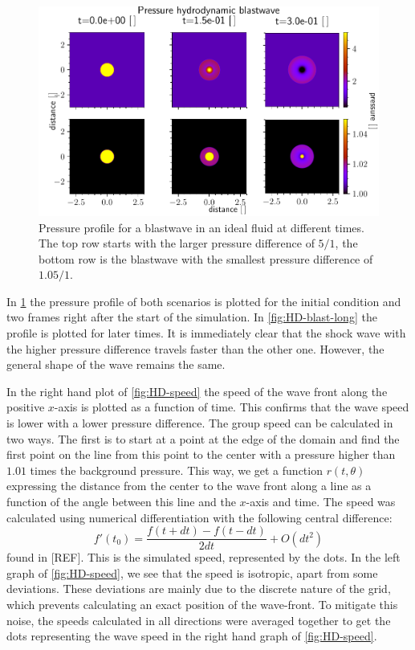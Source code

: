 \begin{figure}[H]
	\centering
	\includegraphics[width=\linewidth]{images/HD-blast-prs-1.pdf}
	\caption{Pressure profile for a blastwave in an ideal fluid at different times. The top row starts with the larger pressure difference of $5/1$, the bottom row is the blastwave with the smallest pressure difference of $1.05/1$.}
	\label{fig:HD-blast-short}
\end{figure}

In \cref{fig:HD-blast-short} the pressure profile of both scenarios is plotted for the initial condition and two frames right after the start of the simulation.
In \cref{fig:HD-blast-long} the profile is plotted for later times.
It is immediately clear that the shock wave with the higher pressure difference travels faster than the other one. However, the general shape of the wave remains the same.


In the right hand plot of \cref{fig:HD-speed} the speed of the wave front along the positive $x$-axis is plotted as a function of time. This confirms that the wave speed is lower with a lower pressure difference.
The group speed can be calculated in two ways. 
The first is to start at a point at the edge of the domain and find the first point on the line from this point to the center with a pressure higher than $1.01$ times the background pressure.
This way, we get a function $r(t,\theta)$ expressing the distance from the center to the wave front along a line as a function of the angle between this line and the $x$-axis and time.
The speed was calculated using numerical differentiation with the following central difference:
\begin{equation*}
	f'(t_0) = \frac{f(t+dt)-f(t-dt)}{2dt} + O(dt^2)
\end{equation*}
found in [REF]. This is the simulated speed, represented by the dots.
In the left graph of \cref{fig:HD-speed}, we see that the speed is isotropic, apart from some deviations.
These deviations are mainly due to the discrete nature of the grid, which prevents calculating an exact position of the wave-front.
To mitigate this noise, the speeds calculated in all directions were averaged together to get the dots representing the wave speed in the right hand graph of \cref{fig:HD-speed}.

